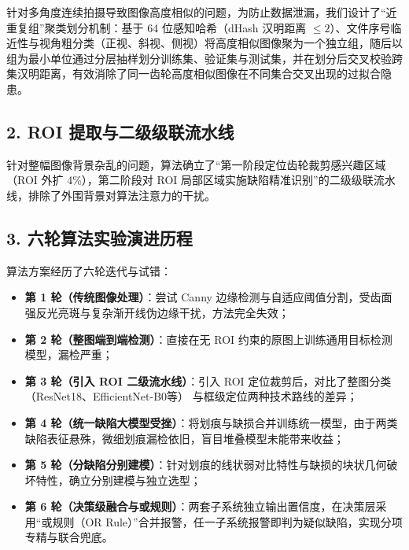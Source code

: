 针对多角度连续拍摄导致图像高度相似的问题，为防止数据泄漏，我们设计了“近重复组”聚类划分机制：基于 64 位感知哈希（dHash 汉明距离 $\le 2$）、文件序号临近性与视角粗分类（正视、斜视、侧视）将高度相似图像聚为一个独立组，随后以组为最小单位通过分层抽样划分训练集、验证集与测试集，并在划分后交叉校验跨集汉明距离，有效消除了同一齿轮高度相似图像在不同集合交叉出现的过拟合隐患。

\subsection*{2. ROI 提取与二级级联流水线}
针对整幅图像背景杂乱的问题，算法确立了“第一阶段定位齿轮裁剪感兴趣区域（ROI 外扩 4\%），第二阶段对 ROI 局部区域实施缺陷精准识别”的二级级联流水线，排除了外围背景对算法注意力的干扰。

\subsection*{3. 六轮算法实验演进历程}
算法方案经历了六轮迭代与试错：
\begin{itemize}
    \item \textbf{第 1 轮（传统图像处理）}：尝试 Canny 边缘检测与自适应阈值分割，受齿面强反光亮斑与复杂渐开线伪边缘干扰，方法完全失效；
    \item \textbf{第 2 轮（整图端到端检测）}：直接在无 ROI 约束的原图上训练通用目标检测模型，漏检严重；
    \item \textbf{第 3 轮（引入 ROI 二级流水线）}：引入 ROI 定位裁剪后，对比了整图分类（ResNet18、EfficientNet-B0等） 与框级定位两种技术路线的差异；
    \item \textbf{第 4 轮（统一缺陷大模型受挫）}：将划痕与缺损合并训练统一模型，由于两类缺陷表征悬殊，微细划痕漏检依旧，盲目堆叠模型未能带来收益；
    \item \textbf{第 5 轮（分缺陷分别建模）}：针对划痕的线状弱对比特性与缺损的块状几何破坏特性，确立分别建模与独立选型；
    \item \textbf{第 6 轮（决策级融合与或规则）}：两套子系统独立输出置信度，在决策层采用“或规则（OR Rule）”合并报警，任一子系统报警即判为疑似缺陷，实现分项专精与联合兜底。
\end{itemize}

